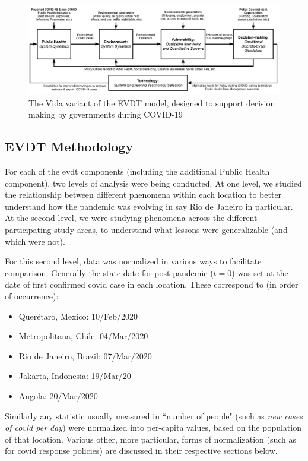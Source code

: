 \begin{figure}[!htb]
	\centering
	\includegraphics[scale=0.25]{Figures/chap5/Vida_Flowchart_v2.jpg}
	\caption[The Vida Variant of the EVDT Model]{The Vida variant of the EVDT model, designed to support decision making by governments during COVID-19}
	\label{fig:vida_flow}
\end{figure}

\subsection{EVDT Methodology} \label{sec:vida-evdt-method}

For each of the \ac{evdt} components (including the additional Public Health component), two levels of analysis were being conducted. At one level, we studied the relationship between different phenomena within each location to better understand how the pandemic was evolving in say Rio de Janeiro in particular. At the second level, we were studying phenomena across the different participating study areas, to understand what lessons were generalizable (and which were not). 

For this second level, data was normalized in various ways to facilitate comparison. Generally the state date for post-pandemic ($t=0$) was set at the date of first confirmed \ac{covid} case in each location. These correspond to (in order of occurrence):

 \begin{itemize}[itemsep=0pt,parsep=0pt]
	\item{Querétaro, Mexico: 10/Feb/2020}
	\item{Metropolitana, Chile: 04/Mar/2020}
	\item{Rio de Janeiro, Brazil: 07/Mar/2020}
	\item{Jakarta, Indonesia: 19/Mar/20}
	\item{Angola: 20/Mar/2020}
\end{itemize}

Similarly any statistic usually measured in ``number of people" (such as \textit{new cases of \ac{covid} per day}) were normalized into per-capita values, based on the population of that location. Various other, more particular, forms of normalization (such as for \ac{covid} response policies) are discussed in their respective sections below.

